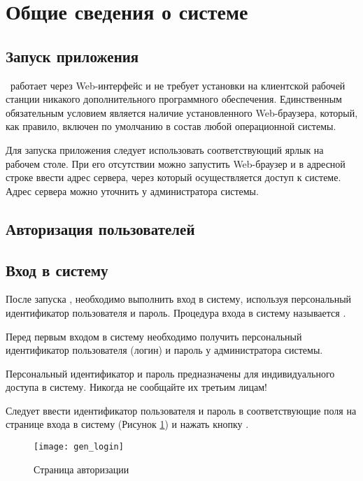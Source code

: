 \newpage
\section{Общие сведения о системе}
\subsection{Запуск приложения}

\tmis~работает через Web-интерфейс и не требует установки на клиентской рабочей станции никакого дополнительного программного обеспечения. Единственным обязательным условием является наличие установленного Web-браузера, который, как правило, включен по умолчанию в состав любой операционной системы.

Для запуска приложения следует использовать соответствующий ярлык на рабочем столе. При его отсутствии можно запустить Web-браузер и в адресной строке ввести адрес сервера, через который осуществляется доступ к системе. Адрес сервера можно уточнить у администратора системы. 

\subsection{Авторизация пользователей}

\subsection{Вход в систему}

После запуска \tmis , необходимо выполнить вход в систему, используя персональный идентификатор пользователя и пароль. Процедура входа в систему называется . \label{auth}

Перед первым входом в систему необходимо получить персональный идентификатор пользователя (логин) и пароль у администратора системы.

\begin{vnim}
 Персональный идентификатор и пароль предназначены для индивидуального доступа в систему. Никогда не сообщайте их третьим лицам!
\end{vnim}
 
Следует ввести идентификатор пользователя и пароль в соответствующие поля на странице входа в систему (Рисунок \ref{img_gen_login}) и нажать кнопку .

\begin{figure}[!ht]\centering
 \texttt{[image: gen\_login]}
 \caption{Страница авторизации}
 \label{img_gen_login}
\end{figure} 

